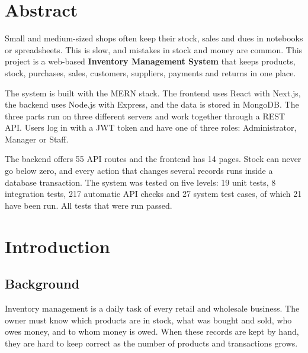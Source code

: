 \documentclass[11pt,a4paper]{article}
\begin{document}
\section*{Abstract}
Small and medium-sized shops often keep their stock, sales and dues in notebooks or spreadsheets. This is slow, and mistakes in stock and money are common. This project is a web-based \textbf{Inventory Management System} that keeps products, stock, purchases, sales, customers, suppliers, payments and returns in one place.

The system is built with the MERN stack. The frontend uses React with Next.js, the backend uses Node.js with Express, and the data is stored in MongoDB. The three parts run on three different servers and work together through a REST API. Users log in with a JWT token and have one of three roles: Administrator, Manager or Staff.

The backend offers 55 API routes and the frontend has 14 pages. Stock can never go below zero, and every action that changes several records runs inside a database transaction. The system was tested on five levels: 19 unit tests, 8 integration tests, 217 automatic API checks and 27 system test cases, of which 21 have been run. All tests that were run passed.

\newpage
\tableofcontents
\newpage

\section{Introduction}
\subsection{Background}
Inventory management is a daily task of every retail and wholesale business. The owner must know which products are in stock, what was bought and sold, who owes money, and to whom money is owed. When these records are kept by hand, they are hard to keep correct as the number of products and transactions grows.
\end{document}
